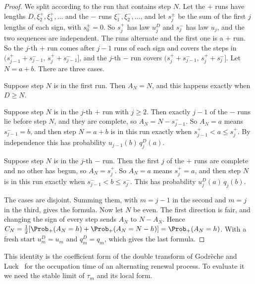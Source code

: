 \begin{proof}
We split according to the run that contains step $N$. Let the $+$ runs have
lengths $D,\xi^+_2,\xi^+_3,\dots$ and the $-$ runs
$\xi^-_1,\xi^-_2,\dots$, and let $s^\pm_j$ be the sum of the first $j$ lengths
of each sign, with $s^\pm_0=0$. So $s^+_j$ has law $u^D_j$ and $s^-_j$ has law
$u_j$, and the two sequences are independent. The runs alternate and the
first one is a $+$ run. So the $j$-th $+$ run comes after $j-1$ runs of each
sign and covers the steps in $(s^+_{j-1}+s^-_{j-1},\,s^+_j+s^-_{j-1}]$, and
the $j$-th $-$ run covers $(s^+_j+s^-_{j-1},\,s^+_j+s^-_j]$. Let $N=a+b$.
There are three cases.

Suppose step $N$ is in the first run. Then $A_N=N$, and this happens exactly
when $D\ge N$.

Suppose step $N$ is in the $j$-th $+$ run with $j\ge2$. Then exactly $j-1$ of
the $-$ runs lie before step $N$, and they are complete, so
$A_N=N-s^-_{j-1}$. So $A_N=a$ means $s^-_{j-1}=b$, and then step $N=a+b$ is
in this run exactly when $s^+_{j-1}<a\le s^+_j$. By independence this has
probability $u_{j-1}(b)\,q^D_j(a)$.

Suppose step $N$ is in the $j$-th $-$ run. Then the first $j$ of the $+$ runs
are complete and no other has begun, so $A_N=s^+_j$. So $A_N=a$ means
$s^+_j=a$, and then step $N$ is in this run exactly when
$s^-_{j-1}<b\le s^-_j$. This has probability $u^D_j(a)\,q_j(b)$.

The cases are disjoint. Summing them, with $m=j-1$ in the second and $m=j$ in
the third, gives the formula. Now let $N$ be even. The first direction is
fair, and changing the sign of every step sends $A_N$ to $N-A_N$. Hence
$C_N=\frac12[\Prob_+(A_N=h)+\Prob_+(A_N=N-h)]=\Prob_+(A_N=h)$. With a fresh
start $u^D_m=u_m$ and $q^D_m=q_m$, which gives the last formula.
\end{proof}

This identity is the coefficient form of the double transform of Godr\`eche
and Luck~\cite[Section~7]{godrecheluck2001} for the occupation time of an
alternating renewal process. To evaluate it we need the stable limit of
$\tau_m$ and its local form.

